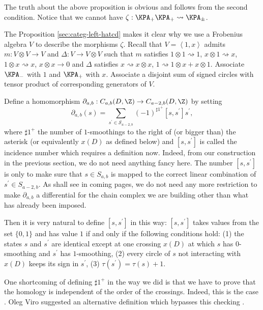 The truth about the above proposition is obvious and follows from the second condition. Notice that we cannot have $\zeta : \KPA_+\KPA_+ \rightsquigarrow \KPA_{\pm}$.

\begin{remark}
The Proposition \ref{sec:categ-left-hatcd} makes it clear why we use a Frobenius algebra $V$ to describe the morphisms $\zeta$. Recall that $V = \left< 1, x\right> $ admits $m : V\otimes V \to V$ and $\Delta : V \to V \otimes V$ such that $m$ satisfies $1 \otimes 1 \rightsquigarrow 1$, $x \otimes 1 \rightsquigarrow x$, $1 \otimes x \rightsquigarrow x$, $x \otimes x \to 0$ and $\Delta$ satisfies $x \rightsquigarrow x \otimes x$, $1 \rightsquigarrow 1\otimes x + x\otimes 1$. Associate $\KPA_-$ with $1$ and $\KPA_+$ with $x$. Associate a disjoint sum of signed circles with tensor product of corresponding generators of $V$. 
\end{remark}

Define a homomorphism $\partial_{a,b}: C_{a,b}(D, \Z) \to C_{a-2,b}(D, \Z)$ by setting 
\begin{equation}
\label{6:eq:23}
\partial_{a,b}(s) = \sum_{s^{\prime} \in \mathcal{S}_{a-2,b}}^{} (-1)^{\sharp 1^+} [s, s^{\prime}] s^{\prime},
\end{equation}
where $\sharp 1^+$ the number of $1$-smoothings to the right of (or bigger than) the asterisk (or equivalently $x(D)$ as defined below) and $[s,s^{\prime}]$ is called the incidence number which requires a definition now. Indeed, from our construction in the previous section, we do not need anything fancy here. The number $[s, s^{\prime}]$ is only to make sure that $s \in S_{a,b}$ is mapped to the correct linear combination of $s^{\prime} \in S_{a-2,b}$. As shall see in coming pages, we do not need any more restriction to make $\partial_{a,b}$ a differential for the chain complex we are building other than what has already been imposed.

Then it is very natural to define $[s, s^{\prime}]$ in this way: $[s, s^{\prime}]$ takes values from the set $\{0, 1\}$ and has value $1$ if and only if the following conditions hold: (1) the states $s$ and $s^{\prime}$ are identical except at one crossing $x(D)$ at which $s$ has $0$-smoothing and $s^{\prime}$ has $1$-smoothing, (2) every circle of $s$ not interacting with $x(D)$ keeps its sign in $s^{\prime}$, (3) $\tau(s^{\prime}) = \tau(s) + 1$.

\begin{remark}
One shortcoming of defining $\sharp 1^+$ in the way we did is that we have to prove that the homology is independent of the order of the crossings. Indeed, this is the case \cite{10.1215/S0012-7094-00-10131-7}. Oleg Viro suggested an alternative definition which bypasses this checking \cite{OlegViro2004}.
\end{remark}


